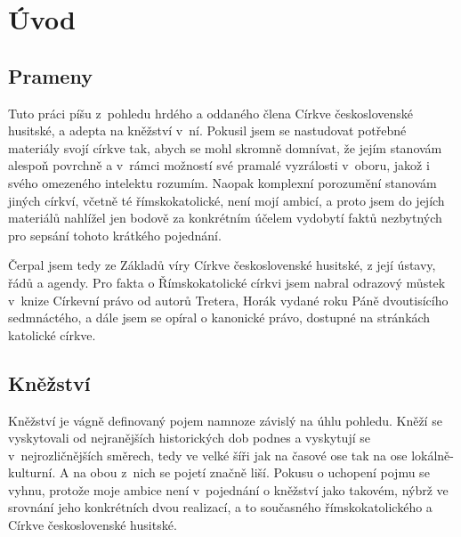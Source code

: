 \chapter{Úvod}
\label{kap:uvod}

\section{Prameny}

Tuto práci píšu z~pohledu hrdého a oddaného člena Církve československé
husitské, a adepta na kněžství v~ní. Pokusil jsem se nastudovat potřebné
materiály svojí církve tak, abych se mohl skromně domnívat, že jejím stanovám
alespoň povrchně a v~rámci možností své pramalé vyzrálosti v~oboru, jakož i
svého omezeného intelektu rozumím. Naopak komplexní porozumění stanovám jiných
církví, včetně té římskokatolické, není mojí ambicí, a proto jsem do jejích
materiálů nahlížel jen bodově za konkrétním účelem vydobytí faktů nezbytných pro
sepsání tohoto krátkého pojednání.

Čerpal jsem tedy ze Základů víry Církve československé husitské, z její ústavy,
řádů a agendy. Pro fakta o Římskokatolické církvi jsem nabral odrazový můstek
v~knize Církevní právo od autorů Tretera, Horák vydané roku Páně dvoutisícího
sedmnáctého, a dále jsem se opíral o kanonické právo, dostupné na stránkách
katolické církve.

\section{Kněžství}

Kněžství je vágně definovaný pojem namnoze závislý na úhlu pohledu. Kněží se
vyskytovali od nejranějších historických dob podnes a vyskytují se
v~nejrozličnějších směrech, tedy ve velké šíři jak na časové ose tak na ose
lokálně-kulturní. A na obou z~nich se pojetí značně liší. Pokusu o uchopení
pojmu se vyhnu, protože moje ambice není v~pojednání o kněžství jako takovém,
nýbrž ve srovnání jeho konkrétních dvou realizací, a to současného
římskokatolického a Církve československé husitské.

